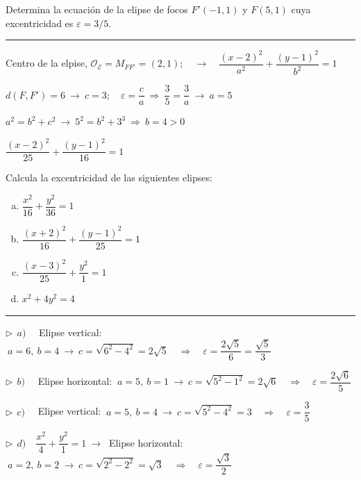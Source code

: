 \vspace{4mm}
\begin{miejercicio}

Determina la ecuación de la elipse de focos $F'(-1,1)$ y $F(5,1)$ cuya excentricidad es $\varepsilon =3/5$.

\rule{250pt}{0.1pt}

\vspace{2mm} Centro de la elpise, $\mathcal O_{\mathcal E}=M_{FF'}=(2,1);\quad \to \quad \dfrac{(x-2)^2}{a^2}+\dfrac{(y-1)^2}{b^2}=1$

\vspace{2mm} $d(F,F')=6 \ \to \ c=3 ;\quad \varepsilon=\dfrac c a \ \Rightarrow \ \dfrac 3 5 = \dfrac 3 a \ \to \ a=5$

\vspace{2mm} $a^2=b^2+c^2 \ \to \ 5^2=b^2+3^3 \ \Rightarrow \ b=4>0$

\vspace{2mm}	$\dfrac{(x-2)^2}{25}+\dfrac{(y-1)^2}{16}=1$
\end{miejercicio}

\vspace{4mm}
\begin{miejercicio}

Calcula la excentricidad de las siguientes elipses:

\begin{multicols}{2}
\begin{enumerate}[a) ]
\item $\dfrac{x^2}{16}+\dfrac{y^2}{36}=1$
\item $\dfrac{(x+2)^2}{16}+\dfrac{(y-1)^2}{25}=1$	
\item $\dfrac{(x-3)^2}{25}+\dfrac{y^2}{1}=1$
\item $x^2+4y^2=4$
\end{enumerate}	
\end{multicols}

\rule{250pt}{0.1pt}

\vspace{2mm} $\triangleright \ \ a)\quad $ Elipse vertical: $\ a=6,\ b=4 \ \to \ c=\sqrt{6^2-4^2}=2\sqrt{5} \quad \Rightarrow \quad \varepsilon=\dfrac{2\sqrt{5}}{6}=\dfrac{\sqrt{5}}{3}$

\vspace{4mm} $\triangleright \ \ b)\quad $ Elipse horizontal: $\ a=5,\ b=1 \ \to \ c=\sqrt{5^2-1^2}=2\sqrt{6} \quad \Rightarrow \quad \varepsilon=\dfrac{2\sqrt{6}}{5}$

\vspace{4mm} $\triangleright \ \ c)\quad $ Elipse vertical: $\ a=5,\ b=4 \ \to \ c=\sqrt{5^2-4^2}=3 \quad \Rightarrow \quad \varepsilon=\dfrac{3}{5}$

\vspace{4mm} $\triangleright \ \ d)\quad \dfrac{x^2}{4}+\dfrac{y^2}{1}=1 \ \to \ $ Elipse horizontal: $\ a=2,\ b=2 \ \to \ c=\sqrt{2^2-2^2}=\sqrt{3} \quad \Rightarrow \quad \varepsilon=\dfrac{\sqrt{3}}{2}$
	
\end{miejercicio}

